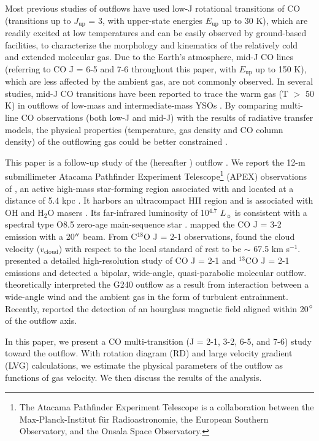 Most previous studies of outflows have used low-J rotational transitions of CO (transitions up to $J_{\mathrm{up}}$ = 3, with upper-state energies $E_{\mathrm{up}}$ up to 30 K), which are readily excited at low temperatures and can be easily observed by ground-based facilities, to characterize the morphology and kinematics of the relatively cold and extended molecular gas. Due to the Earth's atmosphere, mid-J CO lines (referring to CO J = 6-5 and 7-6 throughout this paper, with  $E_{\mathrm{up}}$ up to 150 K), which are less affected by the ambient gas, are not commonly observed. In several studies, mid-J CO transitions have been reported to trace the warm gas (T $>$ 50 K) in outflows of low-mass and intermediate-mass YSOs \citep{2009A&A...501..633V, 2009A&A...507.1425V, 2012A&A...542A..86Y, 2016A&A...587A..17V}. By comparing multi-line CO observations (both low-J and mid-J) with the results of radiative transfer models, the physical properties (temperature, gas density and CO column density) of the outflowing gas could be better constrained \citep{2015A&A...581A...4L}. 

This paper is a follow-up study of the  (hereafter ) outflow \citep{2009ApJ...696...66Q}. We report the 12-m submillimeter Atacama Pathfinder Experiment Telescope\footnote{    The Atacama Pathfinder Experiment Telescope is a collaboration between the Max-Planck-Institut f{\"u}r Radioastronomie, the European Southern Observatory, and the Onsala Space Observatory.} (APEX) observations of , an active high-mass star-forming region associated with  and located at a distance of 5.4 kpc \citep{2014ApJ...790...99C, 2015PASJ...67...69S}. It harbors an ultracompact H{\scriptsize II} region and is associated with OH and H$_2$O masers \citep{1993AJ....105.1495H, 1997MNRAS.289..203C, 1998AJ....116.1897M, 1999ApJS..123..487M, 2003MNRAS.341..551C}. Its far-infrared luminosity of 10$^{4.7}$ $L_\sun$ is consistent with a spectral type O8.5 zero-age main-sequence star \citep{1998AJ....116.1897M}. \citet{2003A&A...412..175K} mapped the CO J = 3-2 emission with a 20${\mbox{$^{\prime\prime}$}}$ beam. From C$^{18}$O J = 2-1 observations, \citet{2003A&A...412..175K} found the cloud velocity ($v_{\mathrm{cloud}}$) with respect to the local standard of rest to be $\sim$ 67.5 km s$^{-1}$. \citet{2009ApJ...696...66Q} presented a detailed high-resolution study of CO J = 2-1 and $^{13}$CO J = 2-1 emissions and detected a bipolar, wide-angle, quasi-parabolic molecular outflow. \citet{2013A&A...559A..23L} theoretically interpreted the G240 outflow as a result from interaction between a wide-angle wind and the ambient gas in the form of turbulent entrainment. Recently, \citet{2014ApJ...794L..18Q} reported the detection of an hourglass magnetic field aligned within 20${\mbox{$^\circ$}}$ of the outflow axis.

In this paper, we present a CO multi-transition (J = 2-1, 3-2, 6-5, and 7-6) study toward the  outflow. With rotation diagram (RD) and large velocity gradient (LVG) calculations, we estimate the physical parameters of the outflow as functions of gas velocity. We then discuss the results of the analysis.


